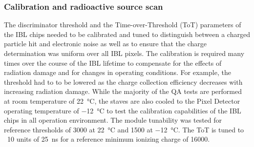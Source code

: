 \subsubsection{Calibration and radioactive source scan}

The discriminator threshold and the Time-over-Threshold (ToT) parameters of the IBL chips needed to be calibrated and tuned to distinguish between a charged particle hit and electronic noise as well as to ensure that the charge determination was uniform over all IBL pixels. The calibration is required many times over the course of the IBL lifetime to compensate for the effects of radiation damage and for changes in operating conditions. For example, the threshold had to to be lowered as the charge collection efficiency decreases with increasing radiation damage. While the majority of the QA tests are performed at room temperature of \SI{22}{\celsius}, the staves are also cooled to the Pixel Detector operating temperature of \SI{-12}{\celsius} to test the calibration capabilities of the IBL chips in all operation environment. The module tunability was tested for reference thresholds of \SI{3000}{\e} at \SI{22}{\celsius} and \SI{1500}{\e} at \SI{-12}{\celsius}. The ToT is tuned to ~10 units of \SI{25}{\nano\second} for a reference minimum ionizing charge of \SI{16000}{\e}.

